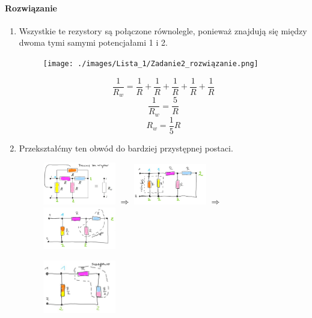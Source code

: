\documentclass[12pt, a4paper]{article}
\begin{document}
\paragraph{Rozwiązanie}
\begin{enumerate}[label=\alph*)]
  \item Wszystkie te rezystory są połączone równolegle, ponieważ znajdują się
        między dwoma tymi samymi potencjałami 1 i 2.
        \begin{figure}[H]
          \centering
          \texttt{[image: ./images/Lista\_1/Zadanie2\_rozwiązanie.png]}
        \end{figure}
        $$
          \frac{1}{R_w} = \frac{1}{R} + \frac{1}{R} + \frac{1}{R} + \frac{1}{R} + \frac{1}{R}
        $$
        $$
          \frac{1}{R_w} = \frac{5}{R}
        $$
        $$
          R_w = \frac{1}{5}R
        $$
  \item Przekształćmy ten obwód do bardziej przystępnej postaci.
        \begin{figure}[H]
          \centering
          \includegraphics[width = 0.3\textwidth]{./images/Lista_1/Zadanie2b_1.png}
          $ \Rightarrow $
          \includegraphics[width = 0.3\textwidth]{./images/Lista_1/Zadanie2b_2.png}
          $ \Rightarrow $
          \includegraphics[width = 0.3\textwidth]{./images/Lista_1/Zadanie2b_3.png}
        \end{figure}
        \begin{figure}[H]
          \centering
          \includegraphics[width = 0.3\textwidth]{./images/Lista_1/Zadanie2b_4.png}

\end{figure}
\end{enumerate}
\end{document}
